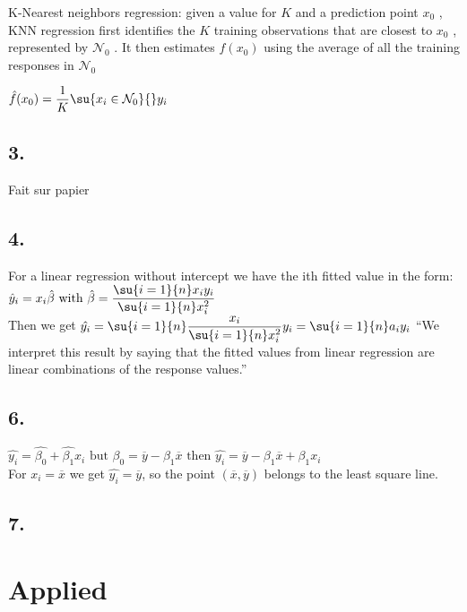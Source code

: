\documentclass[a4paper, 10pt]{scrartcl}  %
\begin{document}
K-Nearest neighbors regression: given a value for $K$ and a prediction 
point $x_{0}$ , KNN regression first identifies the $K$ training 
observations that are closest to
$x_{0}$ , represented by $\mathcal{N}_{0}$ . It then estimates $f(x_{0})$ using the
average of all the training responses in $\mathcal{N}_{0}$
\begin{center}
	$\hat{f}(x_{0})=\dfrac{1}{K}\su{ {x_{i}\in\mathcal{N}_{0}}}{}y_{i}$
\end{center}
\subsection{3.}
Fait sur papier
\subsection{4.}
For a linear regression without intercept we have the ith fitted value
in the form: $\hat{y}_{i}=x_{i}\hat{\beta}\text{ with }\hat{\beta}=
\dfrac{\su{ {i=1}}{n}x_{i}y_{i}}{\su{ {i=1}}{n}x_{i}^{2}}$\\Then we get
$\hat{y_{i}}=\su{ {i=1}}{n}\dfrac{x_{i}}{\su{ {i=1}}{n}x_{i}^{2}}y_{i}=
\su{ {i=1}}{n}a_{i}y_{i}$
``We interpret this result by saying that the fitted values from
linear regression are linear combinations of the response values.''
\subsection{6.}
$\hat{y_{i}}=\hat{\beta_{0}}+\hat{\beta_{1}}x_{i}\text{ but }\beta_{0}=
\overline{y}-\beta_{1}\overline{x}\text{ then }\hat{y_{i}}=\overline{y}
-\beta_{1}\overline{x}+\beta_{1}x_{i}$\\ For $x_{i}=\overline{x}$ we
get $\hat{y_{i}}=\overline{y}$, so the point $(\overline{x},\overline{y})$ belongs to the least square line.
\subsection{7.}

\section{Applied}
\end{document}
